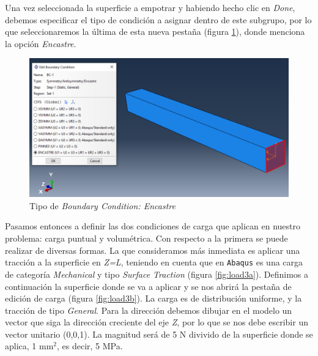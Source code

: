 \documentclass[spanish,a4paper,12pt]{article}
\begin{document}
Una vez seleccionada la superficie a empotrar y habiendo hecho clic en \emph{Done}, debemos especificar el tipo de condición a asignar dentro de este subgrupo, por lo que seleccionaremos la última de esta nueva pestaña (figura \ref{fig:load2}), donde menciona la opción \emph{Encastre}.

\begin{figure}[h!tp]
\centering
\includegraphics[scale=0.4]{capturas/load3.png}
\caption{Tipo de \emph{Boundary Condition: Encastre}}
\label{fig:load2}
\end{figure}

Pasamos entonces a definir las dos condiciones de carga que aplican en nuestro problema: carga puntual y volumétrica. Con respecto a la primera se puede realizar de diversas formas. La que consideramos más inmediata es aplicar una tracción a la superficie en \emph{Z=L}, teniendo en cuenta que en \texttt{Abaqus} es una carga de categoría \emph{Mechanical} y tipo \emph{Surface Traction} (figura \ref{fig:load3a}). Definimos a continuación la superficie donde se va a aplicar y se nos abrirá la pestaña de edición de carga (figura \ref{fig:load3b}). La carga es de distribución uniforme, y la tracción de tipo \emph{General}. Para la dirección debemos dibujar en el modelo un vector que siga la dirección creciente del eje \emph{Z}, por lo que se nos debe escribir un vector unitario (0,0,1). La magnitud  será de 5 N divivido de la superficie donde se aplica, 1 mm$^2$, es decir, 5 MPa.
\end{document}
